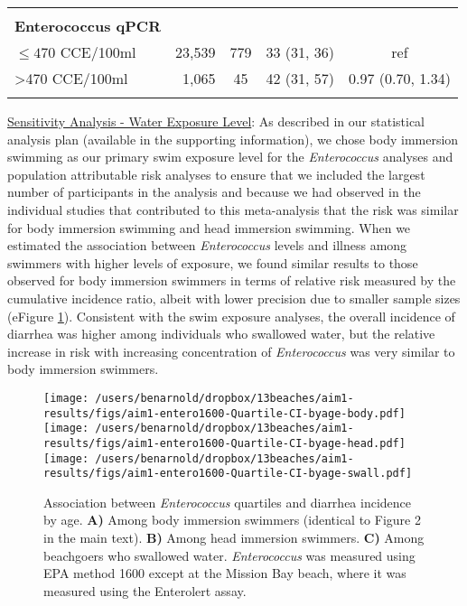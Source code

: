\documentclass[12pt]{article}\usepackage[]{graphicx}\usepackage[]{color}
\begin{document}
\begin{table}[h!tb]
\begin{center}
\begin{footnotesize}
\begin{tabular}{l rc c c}
& \\
\textbf{Enterococcus qPCR} \\
 $\leq470$ CCE/100ml & 23,539 &    779 & 33 (31, 36) & ref \\ 
  >470 CCE/100ml &  1,065 &     45 & 42 (31, 57) & 0.97 (0.70, 1.34) \\ 
  
& \\
\hline
\end{tabular}
\end{footnotesize}
\end{center}
\end{table}



\clearpage
\underline{Sensitivity Analysis - Water Exposure Level}: As described in our statistical analysis plan (available in the supporting information), we chose body immersion swimming as our primary swim exposure level for the \emph{Enterococcus} analyses and population attributable risk analyses to ensure that we included the largest number of participants in the analysis and because we had observed in the individual studies that contributed to this meta-analysis that the risk was similar for body immersion swimming and head immersion swimming. When we estimated the association between \emph{Enterococcus} levels and illness among swimmers with higher levels of exposure, we found similar results to those observed for body immersion swimmers in terms of relative risk measured by the cumulative incidence ratio, albeit with lower precision due to smaller sample sizes (eFigure \ref{fig:enterosens}). Consistent with the swim exposure analyses, the overall incidence of diarrhea was higher among individuals who swallowed water, but the relative increase in risk with increasing concentration of \emph{Enterococcus} was very similar to body immersion swimmers.

\begin{figure}[h!tb]
\begin{center}
\texttt{[image: /users/benarnold/dropbox/13beaches/aim1-results/figs/aim1-entero1600-Quartile-CI-byage-body.pdf]} \\
\texttt{[image: /users/benarnold/dropbox/13beaches/aim1-results/figs/aim1-entero1600-Quartile-CI-byage-head.pdf]} \\
\texttt{[image: /users/benarnold/dropbox/13beaches/aim1-results/figs/aim1-entero1600-Quartile-CI-byage-swall.pdf]}
\caption{Association between \emph{Enterococcus} quartiles and diarrhea incidence by age. \textbf{A)} Among body immersion swimmers (identical to Figure 2 in the main text). \textbf{B)} Among head immersion swimmers. \textbf{C)} Among beachgoers who swallowed water. \emph{Enterococcus} was measured using EPA method 1600 except at the Mission Bay beach, where it was measured using the Enterolert assay. \label{fig:enterosens}}
\end{center}
\end{figure}
\end{document}
